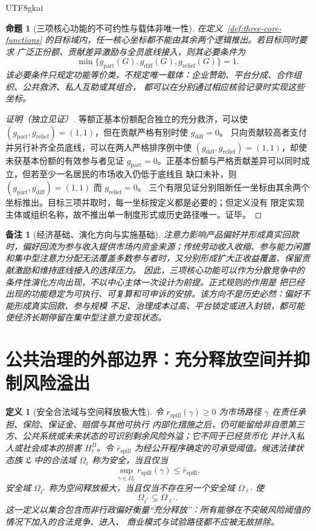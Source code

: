\documentclass[12pt,a4paper,openany]{report}
\newtheorem{definition}{定义}[chapter]
\newtheorem{proposition}{命题}[chapter]
\newtheorem{remark}{备注}[chapter]
\begin{document}
\begin{CJK*}{UTF8}{gkai}
\begin{proposition}[三项核心功能的不可约性与载体非唯一性]
\label{prop:three-functions-irreducible}
在定义~\ref{def:three-core-functions} 的目标域内，任一核心坐标都不能由其余两个逻辑推出。若目标同时要求
广泛正份额、贡献差异激励与全员底线接入，则其必要条件为
\[
  \min\{g_{\mathrm{part}}(G),g_{\mathrm{diff}}(G),
  g_{\mathrm{relief}}(G)\}=1.
\]
该必要条件只规定功能等价类，不规定唯一载体：企业赞助、平台分成、合作组织、公共救济、私人互助或其组合，
都可以在分别通过相应核验记录时实现这些坐标。
\end{proposition}

\begin{proof}[证明（独立见证）]
等额正基本份额配合独立的充分救济，可以使
\((g_{\mathrm{part}},g_{\mathrm{relief}})=(1,1)\)，但在贡献严格有别时使 \(g_{\mathrm{diff}}=0\)。
只向贡献较高者支付并另行补齐全员底线，可以在两人严格排序例中使
\((g_{\mathrm{diff}},g_{\mathrm{relief}})=(1,1)\)，却使未获基本份额的有效参与者见证
\(g_{\mathrm{part}}=0\)。正基本份额与严格贡献差异可以同时成立，但若至少一名居民的市场收入仍低于底线且
缺口未补，则 \((g_{\mathrm{part}},g_{\mathrm{diff}})=(1,1)\) 而 \(g_{\mathrm{relief}}=0\)。
三个有限见证分别阻断任一坐标由其余两个坐标推出。目标三项并取时，每一坐标按定义都是必要的；但定义没有
限定实现主体或组织名称，故不推出单一制度形式或历史路径唯一。证毕。
\end{proof}

\begin{remark}[经济基础、演化方向与实施基础]
注意力影响产品偏好并形成真实回款时，偏好回流为参与收入提供市场内资金来源；传统劳动收入收缩、参与能力闲置
和集中型注意力分配无法覆盖多数参与者时，又分别形成扩大正收益覆盖、保留贡献激励和维持底线接入的选择压力。
因此，三项核心功能可以作为分散竞争中的条件性演化方向出现，不以中心主体一次设计为前提。正式规则的作用是
把已经出现的功能稳定为可执行、可复算和可申诉的安排。该方向不是历史必然：偏好不能形成真实回款、参与规模
不足、治理成本过高、平台锁定或进入封锁，都可能使经济长期停留在集中型注意力变现状态。
\end{remark}

\section{公共治理的外部边界：充分释放空间并抑制风险溢出}

\begin{definition}[安全合法域与空间释放极大性]
令 \(r_{\mathrm{spill}}(\gamma)\ge0\) 为市场路径 \(\gamma\) 在责任承担、保险、保证金、赔偿与其他可执行
内部化措施之后，仍可能留给非自愿第三方、公共系统或未来状态的可识别剩余风险外溢；它不同于已经货币化
并计入私人或社会成本的损害 \(H_t^B\)。令 \(\bar r_{\mathrm{spill}}\) 为经公开程序确定的可承受阈值。候选法律状态族
\(\mathfrak L\) 中的合法域 \(\Omega_\ell\)
称为安全，当且仅当
\[
  \sup_{\gamma\in\Omega_\ell}r_{\mathrm{spill}}(\gamma)
  \le\bar r_{\mathrm{spill}}.
\]
安全域 \(\Omega_{\ell^*}\) 称为空间释放极大，当且仅当不存在另一个安全域
\(\Omega_{\ell'}\) 使
\[
  \Omega_{\ell^*}\subsetneq\Omega_{\ell'}.
\]
这一定义以集合包含而非行政偏好衡量“充分释放”：所有能够在不突破风险阈值的情况下加入的合法竞争、进入、
商业模式与试验路径都不应被无故排除。
\end{definition}


\end{CJK*}
\end{document}
